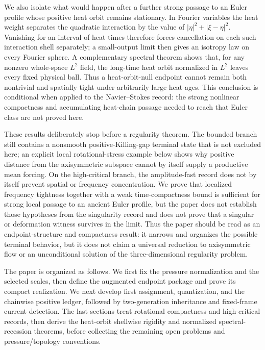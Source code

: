 \documentclass[11pt]{article}
\theoremstyle{definition}\newtheorem{problem}[theorem]{Problem}
\theoremstyle{definition}
\theoremstyle{remark}
\begin{document}
We also isolate what would happen after a further strong passage to an Euler
profile whose positive heat orbit remains stationary.  In Fourier variables the
heat weight separates the quadratic interaction by the value of
\(|\eta|^2+|\xi-\eta|^2\).  Vanishing for an interval of heat times therefore
forces cancellation on each such interaction shell separately; a small-output
limit then gives an isotropy law on every Fourier sphere.  A complementary
spectral theorem shows that, for any nonzero whole-space \(L^2\) field, the
long-time heat orbit normalized in \(L^2\) leaves every fixed physical ball.
Thus a heat-orbit-null endpoint cannot remain both nontrivial and spatially
tight under arbitrarily large heat ages.  This conclusion is conditional when
applied to the Navier--Stokes record: the strong nonlinear compactness and
accumulating heat-chain passage needed to reach that Euler class are not proved
here.

These results deliberately stop before a regularity theorem.  The bounded
branch still contains a nonsmooth positive-Killing-gap terminal state that is
not excluded here; an explicit local rotational-stress example below shows why
positive distance from the axisymmetric subspace cannot by itself supply a
productive mean forcing.  On the high-critical branch, the amplitude-fast
record does not by itself prevent spatial or frequency concentration.  We prove
that localized frequency tightness together with a weak time-compactness bound
is sufficient for strong local passage to an ancient Euler profile, but the
paper does not establish those hypotheses from the singularity record and does
not prove that a singular or deformation witness survives in the limit.  Thus
the paper should be read as an endpoint-structure and compactness result: it
narrows and organizes the possible terminal behavior, but it does not claim a
universal reduction to axisymmetric flow or an unconditional solution of the
three-dimensional regularity problem.

The paper is organized as follows.  We first fix the pressure normalization and
the selected scales, then define the augmented endpoint package and prove its
compact realization.  We next develop first assignment, quantization, and the
chainwise positive ledger, followed by two-generation inheritance and fixed-frame
current detection.  The last sections treat rotational compactness and high-critical
records, then derive the heat-orbit shellwise rigidity and normalized
spectral-recession theorems, before collecting the remaining open problems and
pressure/topology conventions.
\end{document}
